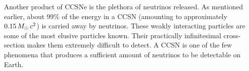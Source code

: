 Another product of CCSNe is the plethora of neutrinos released.
As mentioned earlier, about 99\% of the energy in a CCSN
(amounting to approximately $0.15\,M_{\odot}\,c^{2}$) is carried away by neutrinos.
These weakly interacting particles are some of the most elusive particles known.
Their practically infinitesimal cross-section makes them extremely difficult
to detect.
A CCSN is one of the few phenomena that produces a sufficient amount of
neutrinos to be detectable on Earth.


